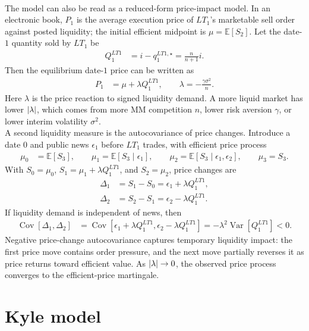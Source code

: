 \documentclass[a4paper,oneside,openany]{book}
\begin{document}
\begin{model}
\par\smallskip\noindent{}\\
The model can also be read as a reduced-form price-impact model. In an electronic book, $P_1$ is the average execution price of $LT_1$'s marketable sell order against posted liquidity; the initial efficient midpoint is $\mu=\mathbb{E}[S_2]$. Let the date-$1$ quantity sold by $LT_1$ be
\begin{align*}
Q_1^{LT1}&=i-q_1^{LT1,\star}=\frac{n}{n+1}i.
\end{align*}
Then the equilibrium date-$1$ price can be written as
\begin{align*}
P_1&=\mu+\lambda Q_1^{LT1}, \qquad
\lambda=-\frac{\gamma\sigma^2}{n}.
\end{align*}
Here $\lambda$ is the price reaction to signed liquidity demand. A more liquid market has lower $\left\lvert\lambda\right\rvert$, which comes from more MM competition $n$, lower risk aversion $\gamma$, or lower interim volatility $\sigma^2$.\\
A second liquidity measure is the autocovariance of price changes. Introduce a date $0$ and public news $\epsilon_1$ before $LT_1$ trades, with efficient price process
\begin{align*}
\mu_0&=\mathbb{E}[S_3], \qquad
\mu_1=\mathbb{E}[S_3\mid\epsilon_1], \qquad
\mu_2=\mathbb{E}[S_3\mid\epsilon_1,\epsilon_2], \qquad
\mu_3=S_3.
\end{align*}
With $S_0=\mu_0$, $S_1=\mu_1+\lambda Q_1^{LT1}$, and $S_2=\mu_2$, price changes are
\begin{align*}
\Delta_1&=S_1-S_0=\epsilon_1+\lambda Q_1^{LT1},\\
\Delta_2&=S_2-S_1=\epsilon_2-\lambda Q_1^{LT1}.
\end{align*}
If liquidity demand is independent of news, then
\begin{align*}
\operatorname{Cov}[\Delta_1,\Delta_2]
&=\operatorname{Cov}[\epsilon_1+\lambda Q_1^{LT1},\epsilon_2-\lambda Q_1^{LT1}]
=-\lambda^2\operatorname{Var}[Q_1^{LT1}]<0.
\end{align*}
Negative price-change autocovariance captures temporary liquidity impact: the first price move contains order pressure, and the next move partially reverses it as price returns toward efficient value. As $\left\lvert\lambda\right\rvert\to0$, the observed price process converges to the efficient-price martingale.
\end{model}

\section*{Kyle model}
\end{document}
